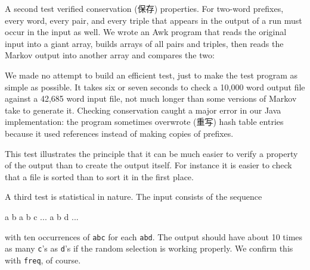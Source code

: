 A second test verified conservation (保存) properties. For two-word
prefixes, every word, every pair, and every triple that appears in the
output of a run must occur in the input as well. We wrote an Awk program
that reads the original input into a giant array, builds arrays of all
pairs and triples, then reads the Markov output into another array and
compares the two:
We made no attempt to build an efficient test, just to make the test
program as simple as possible. It takes six or seven seconds to check a
10,000 word output file against a 42,685 word input file, not much longer
than some versions of Markov take to generate it. Checking conservation
caught a major error in our Java implementation: the program sometimes
overwrote (重写) hash table entries because it used references instead of
making copies of prefixes.

This test illustrates the principle that it can be much easier to verify a
property of the output than to create the output itself. For instance it is
easier to check that a file is sorted than to sort it in the first place.

A third test is statistical in nature. The input consists of the sequence
\begin{wellcode}
    a b a b c ... a b d ...
\end{wellcode}
with ten occurrences of \verb'abc' for each \verb'abd'. The output should
have about 10 times as many \texttt{c}'s as \texttt{d}'s if the random
selection is working properly. We confirm this with \verb'freq', of course.

